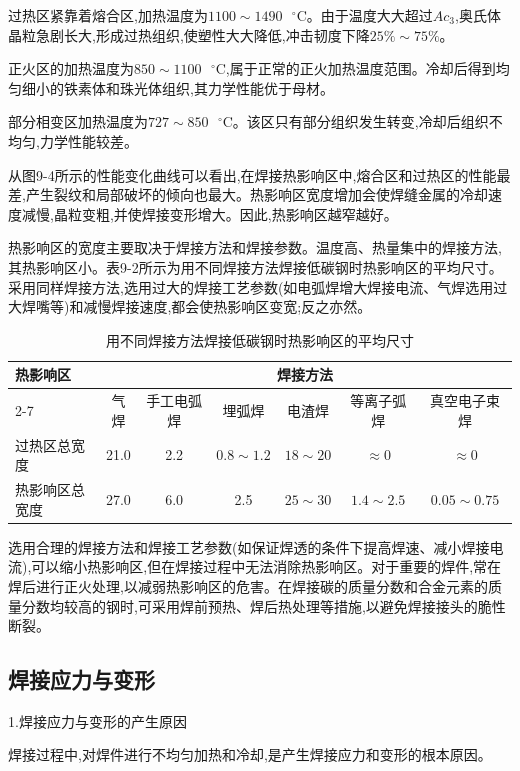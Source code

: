 \documentclass[UTF8]{ctexbook}
\newcommand{\◎}{\ensuremath{\bigcirc}}
\begin{document}
过热区紧靠着熔合区,加热温度为$1100 \sim 1490\text{ }^\circ\text{C}$。由于温度大大超过$Ac_3$,奥氏体晶粒急剧长大,形成过热组织,使塑性大大降低,冲击韧度下降$25\% \sim 75\%$。

正火区的加热温度为$850 \sim 1100\text{ }^\circ\text{C}$,属于正常的正火加热温度范围。冷却后得到均匀细小的铁素体和珠光体组织,其力学性能优于母材。

部分相变区加热温度为$727 \sim 850\text{ }^\circ\text{C}$。该区只有部分组织发生转变,冷却后组织不均匀,力学性能较差。

从图9-4所示的性能变化曲线可以看出,在焊接热影响区中,熔合区和过热区的性能最差,产生裂纹和局部破坏的倾向也最大。热影响区宽度增加会使焊缝金属的冷却速度减慢,晶粒变粗,并使焊接变形增大。因此,热影响区越窄越好。

热影响区的宽度主要取决于焊接方法和焊接参数。温度高、热量集中的焊接方法,其热影响区小。表9-2所示为用不同焊接方法焊接低碳钢时热影响区的平均尺寸。采用同样焊接方法,选用过大的焊接工艺参数(如电弧焊增大焊接电流、气焊选用过大焊嘴等)和减慢焊接速度,都会使热影响区变宽;反之亦然。

\begin{table}[H]
\centering
\caption{用不同焊接方法焊接低碳钢时热影响区的平均尺寸}
\label{tab:9-2}
\small\begin{tabular}{|l|c|c|c|c|c|c|}
\hline
\multirow{2}{*}{热影响区} & \multicolumn{6}{c|}{焊接方法} \\
\cline{2-7}
 & 气焊 & 手工电弧焊 & 埋弧焊 & 电渣焊 & 等离子弧焊 & 真空电子束焊 \\
\hline
过热区总宽度 & 21.0 & 2.2 & $0.8 \sim 1.2$ & $18 \sim 20$ & $\approx 0$ & $\approx 0$ \\
\hline
热影响区总宽度 & 27.0 & 6.0 & 2.5 & $25 \sim 30$ & $1.4 \sim 2.5$ & $0.05 \sim 0.75$ \\
\hline
\end{tabular}
\end{table}
选用合理的焊接方法和焊接工艺参数(如保证焊透的条件下提高焊速、减小焊接电流),可以缩小热影响区,但在焊接过程中无法消除热影响区。对于重要的焊件,常在焊后进行正火处理,以减弱热影响区的危害。在焊接碳的质量分数和合金元素的质量分数均较高的钢时,可采用焊前预热、焊后热处理等措施,以避免焊接接头的脆性断裂。

\subsection{焊接应力与变形}

1.焊接应力与变形的产生原因

焊接过程中,对焊件进行不均匀加热和冷却,是产生焊接应力和变形的根本原因。
\end{document}
